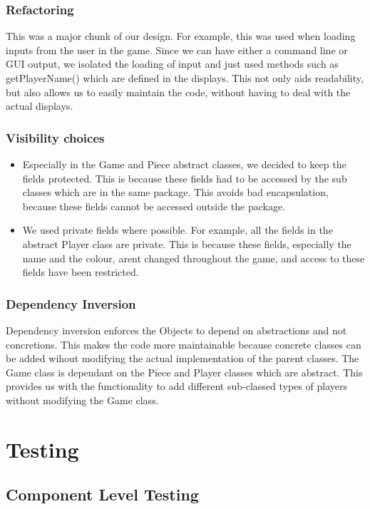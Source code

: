 \documentclass[english]{article}
\begin{document}
\subsubsection{Refactoring }

This was a major chunk of our design. For example, this was used when
loading inputs from the user in the game. Since we can have either
a command line or GUI output, we isolated the loading of input and
just used methods such as getPlayerName() which are defined in the
displays. This not only aids readability, but also allows us to easily
maintain the code, without having to deal with the actual displays.


\subsubsection{Visibility choices}
\begin{itemize}
\item Especially in the Game and Piece abstract classes, we decided to keep
the fields protected. This is because these fields had to be accessed
by the sub classes which are in the same package. This avoids bad
encapsulation, because these fields cannot be accessed outside the
package.
\item We used private fields where possible. For example, all the fields
in the abstract Player class are private. This is because these fields,
especially the name and the colour, arent changed throughout the game,
and access to these fields have been restricted.
\end{itemize}

\subsubsection{Dependency Inversion}

Dependency inversion enforces the Objects to depend on abstractions
and not concretions. This makes the code more maintainable because
concrete classes can be added wihout modifying the actual implementation
of the parent classes. The Game class is dependant on the Piece and
Player classes which are abstract. This provides us with the functionality
to add different sub-classed types of players without modifying the
Game class.


\section{Testing	}


\subsection{Component Level Testing}
\end{document}
